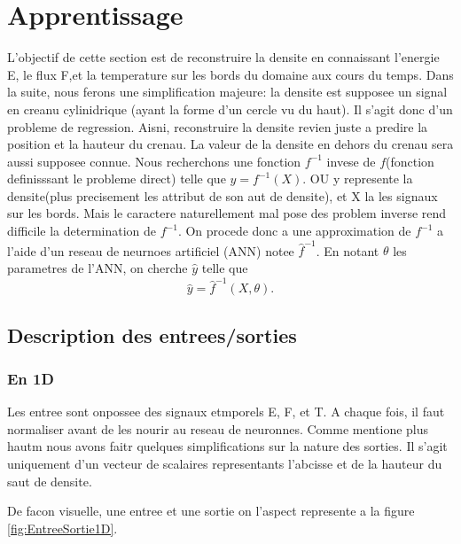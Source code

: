 
\chapter{Apprentissage} %

\label{Chapter4} %

L'objectif de cette section est de reconstruire la densite en connaissant l'energie E, le flux F,et la temperature sur les bords du domaine aux cours du temps. Dans la suite, nous ferons une simplification majeure: la densite est supposee un signal en creanu cylinidrique (ayant la forme d'un cercle vu du haut). Il s'agit donc d'un probleme de regression. Aisni, reconstruire la densite revien juste a predire la position et la hauteur du crenau. La valeur de la densite en dehors du crenau sera aussi supposee connue. Nous recherchons une fonction $f^{-1}$ invese de $f$(fonction definisssant le probleme direct) telle que $y = f^{-1}(X)$. OU y represente la densite(plus precisement les attribut de son aut de densite), et X la les signaux sur les bords. Mais le caractere naturellement mal pose des problem inverse rend difficile la determination de $f^{-1}$. On procede donc a une approximation de $f^{-1}$ a l'aide d'un reseau de neurnoes artificiel (ANN) notee $\hat{f}^{-1}$. En notant $\theta$ les parametres de l'ANN, on cherche $\hat{y}$ telle que$$ \hat{y} = \hat{f}^{-1}(X, \theta). $$


\section{Description des entrees/sorties}

\subsection{En 1D}
Les entree sont onpossee des signaux etmporels E, F, et T. A chaque fois, il faut normaliser avant de les nourir au reseau de neuronnes. Comme mentione plus hautm nous avons faitr quelques simplifications sur la nature des sorties. Il s'agit uniquement d'un vecteur de scalaires representants l'abcisse et de la hauteur du saut de densite.

De facon visuelle, une entree et une sortie on l'aspect represente a la figure \ref{fig:EntreeSortie1D}.

